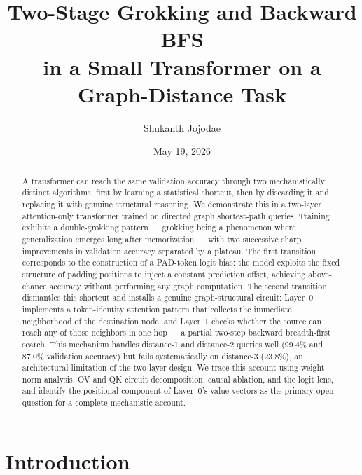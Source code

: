 \documentclass[11pt, a4paper]{article}
\title{%
  \textbf{Two-Stage Grokking and Backward BFS\\
          in a Small Transformer on a Graph-Distance Task}
}
\author{Shukanth Jojodae}
\date{May 19, 2026}
\begin{document}
\maketitle
\tableofcontents
\newpage

\begin{abstract}

A transformer can reach the same validation accuracy through two
mechanistically distinct algorithms: first by learning a statistical
shortcut, then by discarding it and replacing it with genuine structural
reasoning.  We demonstrate this in a two-layer attention-only
transformer trained on directed graph shortest-path queries.  Training
exhibits a double-grokking pattern --- grokking being a phenomenon
where generalization emerges long after memorization --- with two
successive sharp improvements in validation accuracy separated by a
plateau.  The first transition corresponds to the construction of a
PAD-token logit bias: the model exploits the fixed structure of padding
positions to inject a constant prediction offset, achieving above-chance
accuracy without performing any graph computation.  The second
transition dismantles this shortcut and installs a genuine
graph-structural circuit: Layer~0 implements a token-identity attention
pattern that collects the immediate neighborhood of the destination
node, and Layer~1 checks whether the source can reach any of those
neighbors in one hop --- a partial two-step backward breadth-first
search.  This mechanism handles distance-1 and distance-2 queries well
(99.4\% and 87.0\% validation accuracy) but fails systematically on
distance-3 (23.8\%), an architectural limitation of the two-layer
design.  We trace this account using weight-norm analysis, OV and QK
circuit decomposition, causal ablation, and the logit lens, and
identify the positional component of Layer~0's value vectors as the
primary open question for a complete mechanistic account.

\end{abstract}

\section{Introduction}
\label{sec:intro}
\end{document}
